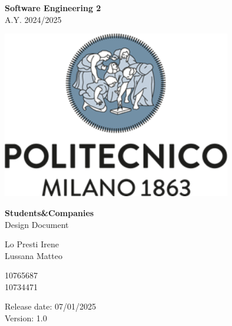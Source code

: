 \documentclass{config/PoliMi3i_thesis}
\numberwithin{algorithm}{chapter}
\begin{document}
%
\fancyhf{} %
\fancyhead[RO,RE]{\thepage} %

\begin{titlepage}

\centering
{\bfseries\LARGE Software Engineering 2\\ 
\vskip0.2cm
}
 \large A.Y. 2024/2025


\vskip1.5cm


\includegraphics[width=10cm]{images/logopoliazzurro.png}\centering
\vskip2cm

     
\centering
{\bfseries \Huge Students\&Companies\\
\vskip0.5cm
}
\huge Design Document\\
\vskip1.5cm
\begin{minipage}[t]{0.45\textwidth} %
    \raggedleft %
        {\Large 
            Lo Presti Irene\\ 
            Lussana Matteo\\
        }
\end{minipage}%
\hfill %
\begin{minipage}[t]{0.45\textwidth} %
    \raggedright %
    {\Large 
        10765687 
        \\ 10734471 \\
    }
\end{minipage}

\vskip2cm
\raggedright\large{
 Release date: 07/01/2025\\
 Version: 1.0}


\end{titlepage}

\pagebreak

\renewcommand*\contentsname{Table Of Contents}
\tableofcontents
\end{document}
